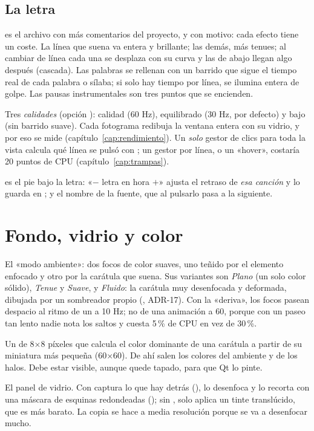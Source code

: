 \subsection{La letra}

 es el archivo con más comentarios del proyecto, y con motivo: cada
efecto tiene un coste. La línea que suena va entera y brillante; las demás, más tenues; al
cambiar de línea cada una se desplaza con su curva y las de abajo llegan algo después (cascada).
Las palabras se rellenan con un barrido que sigue el tiempo real de cada palabra o sílaba; si
solo hay tiempo por línea, se ilumina entera de golpe. Las pausas instrumentales son tres
puntos que se encienden.

Tres \emph{calidades} (opción ): calidad (60 Hz), equilibrado (30 Hz, por
defecto) y bajo (sin barrido suave). Cada fotograma redibuja la ventana entera con su vidrio,
y por eso se mide (capítulo~\ref{cap:rendimiento}). Un \emph{solo} gestor de clics para toda la
vista calcula qué línea se pulsó con ; un gestor por línea, o un «hover», costaría
20 puntos de CPU (capítulo~\ref{cap:trampas}).

 es el pie bajo la letra: «$-$ letra en hora $+$» ajusta el retraso
de \emph{esa canción} y lo guarda en ; y el nombre de la fuente, que al
pulsarlo pasa a la siguiente.

\section{Fondo, vidrio y color}

\begin{description}[style=nextline, leftmargin=0pt]
  \item[\archivo{Ambient.qml}] El «modo ambiente»: dos focos de color suaves, uno teñido
  por el elemento enfocado y otro por la carátula que suena. Sus variantes son \emph{Plano}
  (un solo color sólido), \emph{Tenue} y \emph{Suave}, y \emph{Fluido}: la carátula muy
  desenfocada y deformada, dibujada por un sombreador propio (,
  ADR-17). Con la «deriva», los focos pasean despacio al ritmo de un  a 10 Hz; no
  de una animación a 60, porque con un paseo tan lento nadie nota los saltos y cuesta 5\,\% de
  CPU en vez de 30\,\%.
  \item[\archivo{TintProbe.qml}] Un  de 8$\times$8 píxeles que calcula el color
  dominante de una carátula a partir de su miniatura más pequeña (60$\times$60). De ahí salen
  los colores del ambiente y de los halos. Debe estar visible, aunque quede tapado, para que
  Qt lo pinte.
  \item[\archivo{Glass.qml}] El panel de vidrio. Con  captura lo que hay detrás
  (), lo desenfoca y lo recorta con una máscara de esquinas redondeadas
  (); sin , solo aplica un tinte translúcido, que es más barato.
  La copia se hace a media resolución porque se va a desenfocar mucho.
\end{description}

